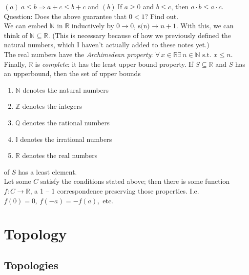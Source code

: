 \documentclass[12pt]{report}
\newcommand{\fall}{\forall\,}
\newcommand{\exst}{\exists\,}
\newcommand{\st}{\textrm{ s.t. }}
\newcommand{\reals}{\mathbb{R}}
\newcommand{\naturals}{\mathbb{N}}
\newcommand{\rationals}{\mathbb{Q}}
\newcommand{\integers}{\mathbb{Z}}
\newcommand{\irrationals}{\mathbb{I}}
\begin{document}
$(a)\ a \leq b \Rightarrow a + c \leq b + c$ and 
$(b)\ $If $a \geq 0$ and $b \leq c$, then $a \cdot b \leq a \cdot c$.\\

Question: Does the above guarantee that $0 < 1$? Find out.\\

We can embed $\naturals$ in $\reals$ inductively by $0 \rightarrow 0$,
$\textrm{s(n)} \rightarrow n+1$. With this, we can think of $\naturals
\subseteq \reals$. (This is necessary because of how we previously defined the
natural numbers, which I haven't actually added to these notes yet.)\\

The real numbers have the {\em Archimedean property}: $\fall x \in \reals
\exst n \in \naturals \st x \leq n$.\\

Finally, $\reals$ is {\em complete}: it has the least upper bound property. If
$S \subseteq \reals$ and $S$ has an upperbound, then the set of upper bounds
\begin{enumerate}
\item $\naturals$ denotes the natural numbers
\item $\integers$ denotes the integers
\item $\rationals$ denotes the rational numbers
\item $\irrationals$ denotes the irrational numbers
\item $\reals$ denotes the real numbers
\end{enumerate}
of $S$ has a least element.\\

Let some $C$ satisfy the conditions stated above; then there is some function
$f: C \rightarrow \reals$, a 1 -- 1 correspondence preserving those properties.
I.e. $f(0) = 0,\ f(-a) = -f(a),$ etc.\\







\chapter{Topology}

\section{Topologies}
\end{document}
